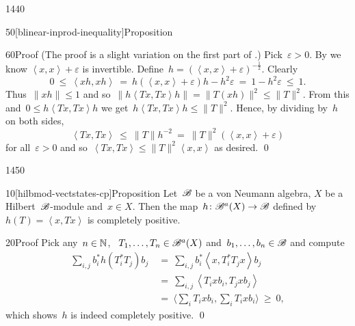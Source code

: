 \begin{parsec}{1440}
\begin{point}{50}[blinear-inprod-inequality]{Proposition}
\begin{point}{60}{Proof}
(The proof is a slight variation on the first part
of \cite[thm.~2.8]{paschke}.)
Pick~$\varepsilon > 0$.
By 
    we know $\left<x,x\right> + \varepsilon$ is invertible.
Define~$h = (\left<x,x\right> + \varepsilon)^{-\frac{1}{2}}$.
Clearly
\begin{equation*}
0 \ \leq\  \left<xh,xh\right>
    \ =\  h (\left<x,x\right> + \varepsilon)h - h^2 \varepsilon
    \ =\  1 - h^2 \varepsilon \ \leq\  1.
\end{equation*}
Thus~$\|xh\| \leq 1$
and so~$\|h\left<Tx, Tx\right>h\| = \|T(xh)\|^2 \leq \|T\|^2$.
From this and~$0 \leq h\left<Tx,Tx\right>h$
we get~$h\left<Tx,Tx\right>h \leq \|T\|^2$. Hence, by dividing by~$h$
    on both sides,
\begin{equation*}
\left<Tx,Tx\right> \ \leq \ \|T\| h^{-2}\  =
    \  \|T\|^2(\left<x,x\right> + \varepsilon)
\end{equation*}
for all~$\varepsilon > 0$
and so~$\left<Tx,Tx\right> \leq \|T\|^2 \left<x,x\right>$ as desired. \qed
\end{point}
\end{point}
\end{parsec}

\begin{parsec}{1450}%
\begin{point}{10}[hilbmod-vectstates-cp]{Proposition}%
Let~$\mathscr{B}$ be a von Neumann algebra,
    $X$ be a Hilbert~$\mathscr{B}$-module
    and~$x \in X$.
Then the map~$h\colon \mathscr{B}^a(X )\to \mathscr{B}$
defined by~$h(T) = \left<x,Tx\right>$
is completely positive.
\begin{point}{20}{Proof}%
Pick any~$n \in \mathbb{N}$, ~$T_1, \ldots, T_n \in \mathscr{B}^a(X)$
    and~$b_1, \ldots, b_n \in \mathscr{B}$
    and compute
\begin{align*}
\sum_{i,j} b_i^* h(T_i^*T_j)b_j
&\ =\ \sum_{i,j} b_i^* \left<x,T_i^*T_j x\right> b_j\\
&\ =\ \sum_{i,j} \left<T_i x b_i,T_j x b_j\right>  \\
&\ =\ \bigl\langle\sum_i T_i x b_i, \sum_i T_i x b_i\bigr\rangle \ \geq\  0,
\end{align*}
which shows~$h$ is indeed completely positive. \qed
\end{point}
\end{point}
\end{parsec}

